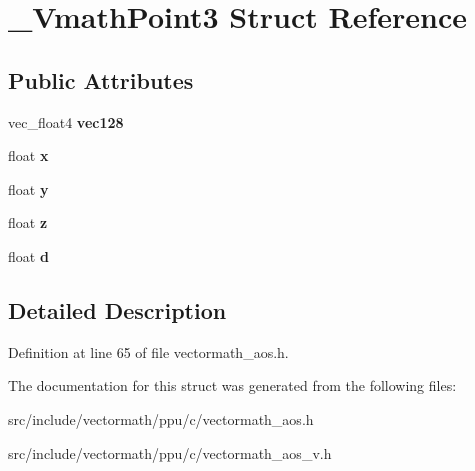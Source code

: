 \hypertarget{struct__VmathPoint3}{\section{\-\_\-\-Vmath\-Point3 Struct Reference}
\label{struct__VmathPoint3}
}
\subsection*{Public Attributes}
\begin{DoxyCompactItemize}
\item 
\hypertarget{struct__VmathPoint3_ab923b3c4fd0d8d3fcee7f61236d4f2d7}{vec\-\_\-float4 {\bfseries vec128}}\label{struct__VmathPoint3_ab923b3c4fd0d8d3fcee7f61236d4f2d7}

\item 
\hypertarget{struct__VmathPoint3_afcd83019622475475346c011efdaee42}{float {\bfseries x}}\label{struct__VmathPoint3_afcd83019622475475346c011efdaee42}

\item 
\hypertarget{struct__VmathPoint3_a69e23d25f5f4b69534b9330dc2a36f71}{float {\bfseries y}}\label{struct__VmathPoint3_a69e23d25f5f4b69534b9330dc2a36f71}

\item 
\hypertarget{struct__VmathPoint3_ac0cd29bab6eeb0c3f2aca4885c64192f}{float {\bfseries z}}\label{struct__VmathPoint3_ac0cd29bab6eeb0c3f2aca4885c64192f}

\item 
\hypertarget{struct__VmathPoint3_af7e61a90f75ecf52f78e16e97a81aea7}{float {\bfseries d}}\label{struct__VmathPoint3_af7e61a90f75ecf52f78e16e97a81aea7}

\end{DoxyCompactItemize}


\subsection{Detailed Description}


Definition at line 65 of file vectormath\-\_\-aos.\-h.



The documentation for this struct was generated from the following files\-:\begin{DoxyCompactItemize}
\item 
src/include/vectormath/ppu/c/vectormath\-\_\-aos.\-h\item 
src/include/vectormath/ppu/c/vectormath\-\_\-aos\-\_\-v.\-h\end{DoxyCompactItemize}
